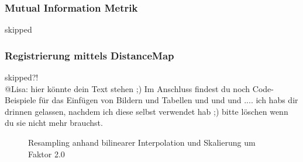 \documentclass[12pt,german]{article}
\begin{document}
\subsubsection{Mutual Information Metrik}
skipped\\
\subsubsection{Registrierung mittels DistanceMap}
skipped?!\\
@Lisa: hier könnte dein Text stehen ;) Im Anschluss findest du noch Code-Beispiele für das Einfügen von Bildern und Tabellen und und und .... ich habs dir drinnen gelassen, nachdem ich diese selbst verwendet hab ;) bitte löschen wenn du sie nicht mehr brauchst.


\newpage


\begin{figure}[H]
	\centering
	\caption{Resampling anhand bilinearer Interpolation und Skalierung um Faktor 2.0}
	\label{fig:resultResamplingBilinearInterpolation-2.0}
\end{figure}




\newpage
\end{document}
